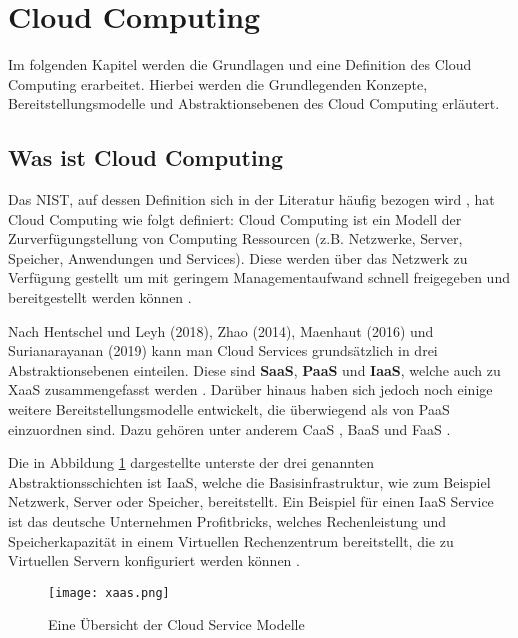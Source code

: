 \section{Cloud Computing}
\label{sec:cloud-computing}
Im folgenden Kapitel werden die Grundlagen und eine Definition des Cloud Computing erarbeitet. Hierbei werden die Grundlegenden Konzepte, Bereitstellungsmodelle und Abstraktionsebenen des Cloud Computing erläutert.

\subsection{Was ist Cloud Computing}
Das \ac{NIST}, auf dessen Definition sich in der Literatur häufig bezogen wird \cite[Vgl.][S. 4f]{Reinheimer2018}, hat Cloud Computing wie folgt definiert: Cloud Computing ist ein Modell der Zurverfügungstellung von Computing Ressourcen (z.B. Netzwerke, Server, Speicher, Anwendungen und Services). Diese werden über das Netzwerk zu Verfügung gestellt um mit geringem Managementaufwand schnell freigegeben und bereitgestellt werden können \cite[Vgl.][S. 2]{Mell2011}\cite[Vgl.][S. 5]{Reinheimer2018}.

Nach Hentschel und Leyh (2018), Zhao (2014), Maenhaut (2016) und Surianarayanan (2019) kann man Cloud Services grundsätzlich in drei Abstraktionsebenen einteilen. Diese sind \textbf{\ac{SaaS}}, \textbf{\ac{PaaS}} und \textbf{\ac{IaaS}}, welche auch zu \ac{XaaS} zusammengefasst werden \cite[Vgl.][S. 9]{Reinheimer2018}\cite[Vgl.][S. 143f]{Zhao2014}\cite[Vgl.][S. 32ff]{Maenhaut2016}\cite[Vgl.][S. 226ff]{Surianarayanan2019}. Darüber hinaus haben sich jedoch noch einige weitere Bereitstellungsmodelle entwickelt, die überwiegend als \grqq{} von \ac{PaaS} einzuordnen sind. Dazu gehören unter anderem \ac{CaaS} \cite[Vgl.][]{Luber2019}, \ac{BaaS} und \ac{FaaS} \cite[Vgl.][]{Luber2022}. \pagebreak

Die in Abbildung \ref{fig:XaaS} dargestellte unterste der drei genannten Abstraktionsschichten ist \ac{IaaS}, welche die Basisinfrastruktur, wie zum Beispiel Netzwerk, Server oder Speicher, bereitstellt. Ein Beispiel für einen \ac{IaaS} Service ist das deutsche Unternehmen Profitbricks, welches Rechenleistung und Speicherkapazität in einem Virtuellen Rechenzentrum bereitstellt, die zu Virtuellen Servern konfiguriert werden können \cite[Vgl.][S. 12]{Reinheimer2018}.

\begin{figure}[H]
    \centering
    \texttt{[image: xaas.png]}
    \caption{Eine Übersicht der Cloud Service Modelle \cite[Eigene Darstellung nach][S. 33]{Maenhaut2016}\cite[Ergänzt durch][]{Toroman2018}}
    \label{fig:XaaS}
\end{figure}

